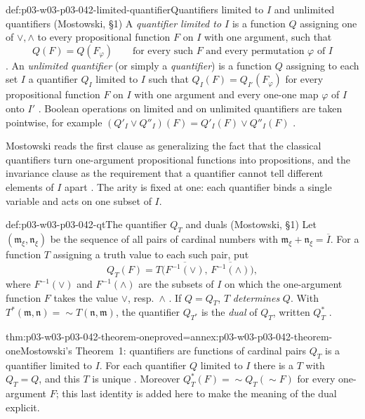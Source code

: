 \begin{hbdefinition}{def:p03-w03-p03-042-limited-quantifier}{Quantifiers limited to \(I\) and unlimited quantifiers (Mostowski, \S1)}
A \emph{quantifier limited to \(I\)} is a function \(Q\) assigning one of
\(\vee,\wedge\) to every propositional function \(F\) on \(I\) with one
argument, such that
\[
 Q(F)=Q(F_\varphi)\qquad\text{for every such }F\text{ and every
 permutation }\varphi\text{ of }I
\]
\cite[p.~13]{Mostowski1957}.  An \emph{unlimited quantifier} (or simply a
\emph{quantifier}) is a function \(Q\) assigning to each set \(I\) a
quantifier \(Q_I\) limited to \(I\) such that \(Q_I(F)=Q_{I'}(F_\varphi)\)
for every propositional function \(F\) on \(I\) with one argument and every
one-one map \(\varphi\) of \(I\) onto \(I'\) \cite[p.~13]{Mostowski1957}.
Boolean operations on limited and on unlimited quantifiers are taken
pointwise, for example \((Q'_I\vee Q''_I)(F)=Q'_I(F)\vee Q''_I(F)\)
\cite[p.~14]{Mostowski1957}.
\end{hbdefinition}

Mostowski reads the first clause as generalizing the fact that the
classical quantifiers turn one-argument propositional functions into
propositions, and the invariance clause as the requirement that a
quantifier cannot tell different elements of \(I\) apart
\cite[p.~13]{Mostowski1957}.  The arity is fixed at one: each quantifier
binds a single variable and acts on one subset of \(I\).

\begin{hbdefinition}{def:p03-w03-p03-042-qt}{The quantifier \(Q_T\) and duals (Mostowski, \S1)}
Let \((\mathfrak m_\xi,\mathfrak n_\xi)\) be the sequence of all pairs of
cardinal numbers with \(\mathfrak m_\xi+\mathfrak n_\xi=\overline{I}\).
For a function \(T\) assigning a truth value to each such pair, put
\[
 Q_T(F)=T\bigl(\overline{F^{-1}(\vee)},\,\overline{F^{-1}(\wedge)}\bigr),
\]
where \(F^{-1}(\vee)\) and \(F^{-1}(\wedge)\) are the subsets of \(I\) on
which the one-argument function \(F\) takes the value \(\vee\), resp.\
\(\wedge\) \cite[p.~13]{Mostowski1957}.  If \(Q=Q_T\), \(T\)
\emph{determines} \(Q\).  With \(T^{*}(\mathfrak m,\mathfrak n)=
{\sim}T(\mathfrak n,\mathfrak m)\), the quantifier \(Q_{T^{*}}\) is the
\emph{dual} of \(Q_T\), written \(Q_T^{*}\) \cite[p.~13]{Mostowski1957}.
\end{hbdefinition}

\begin{hbtheorem}{thm:p03-w03-p03-042-theorem-one}{proved=annex:p03-w03-p03-042-theorem-one}{Mostowski's Theorem~1: quantifiers are functions of cardinal pairs}
\(Q_T\) is a quantifier limited to \(I\).  For each quantifier \(Q\)
limited to \(I\) there is a \(T\) with \(Q_T=Q\), and this \(T\) is unique
\cite[p.~13]{Mostowski1957}.  Moreover \(Q_T^{*}(F)={\sim}Q_T({\sim}F)\)
for every one-argument \(F\); this last identity is added here to make the
meaning of the dual explicit.
\end{hbtheorem}

